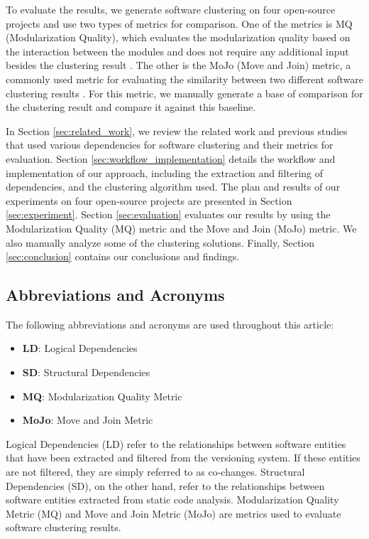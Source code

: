 \documentclass{ieeeaccess}
\begin{document}
To evaluate the results, we generate software clustering on four open-source projects and use two types of metrics for comparison. One of the metrics is MQ (Modularization Quality), which evaluates the modularization quality based on the interaction between the modules and does not require any additional input besides the clustering result \cite{b2}. The other is the MoJo (Move and Join) metric, a commonly used metric for evaluating the similarity between two different software clustering results \cite{b3}. For this metric, we manually generate a base of comparison for the clustering result and compare it against this baseline.

In Section \ref{sec:related_work}, we review the related work and previous studies that used various dependencies for software clustering and their metrics for evaluation.
Section \ref{sec:workflow_implementation} details the workflow and implementation of our approach, including the extraction and filtering of dependencies, and the clustering algorithm used.
The plan and results of our experiments on four open-source projects are presented in Section \ref{sec:experiment}. Section \ref{sec:evaluation} evaluates our results by using the Modularization Quality (MQ) metric and the Move and Join (MoJo) metric. We also manually analyze some of the clustering solutions.
Finally, Section \ref{sec:conclusion} contains our conclusions and findings.

\subsection{Abbreviations and Acronyms}

The following abbreviations and acronyms are used throughout this article:

\begin{itemize}
    \item \textbf{LD}: Logical Dependencies
    \item \textbf{SD}: Structural Dependencies
    \item \textbf{MQ}: Modularization Quality Metric
    \item \textbf{MoJo}: Move and Join Metric
\end{itemize}


Logical Dependencies (LD) refer to the relationships between software entities that have been extracted and filtered from the versioning system. If these entities are not filtered, they are simply referred to as co-changes. 
Structural Dependencies (SD), on the other hand, refer to the relationships between software entities extracted from static code analysis.
Modularization Quality Metric (MQ) and Move and Join Metric (MoJo) are metrics used to evaluate software clustering results.
\end{document}
